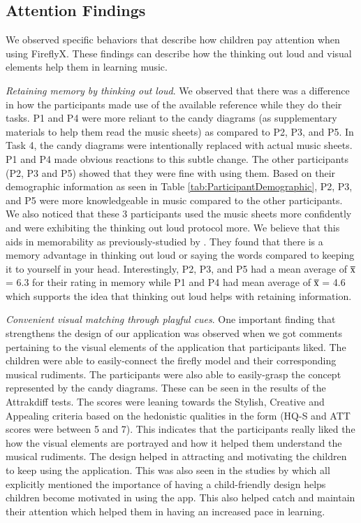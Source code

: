 \subsection{Attention Findings}
We observed specific behaviors that describe how children pay attention when using FireflyX. These findings can describe how the thinking out loud and visual elements help them in learning music.


\textit{Retaining memory by thinking out loud}. We observed that there was a difference in how the participants made use of the available reference while they do their tasks. P1 and P4 were more reliant to the candy diagrams (as supplementary materials to help them read the music sheets) as compared to P2, P3, and P5. In Task 4, the candy diagrams were intentionally replaced with actual music sheets. P1 and P4 made obvious reactions to this subtle change. The other participants (P2, P3 and P5) showed that they were fine with using them. Based on their demographic information as seen in Table \ref{tab:ParticipantDemographic}, P2, P3, and P5 were more knowledgeable in music compared to the other participants. We also noticed that these 3 participants used the music sheets more confidently and were exhibiting the thinking out loud protocol more. We believe that this aids in memorability as previously-studied by . They found that there is a memory advantage in thinking out loud or saying the words compared to keeping it to yourself in your head. Interestingly, P2, P3, and P5 had a mean average of x̅ = 6.3 for their rating in memory while P1 and P4 had mean average of x̅ = 4.6 which supports the idea that thinking out loud helps with retaining information.

\textit{Convenient visual matching through playful cues}. One important finding that strengthens the design of our application was observed when we got comments pertaining to the visual elements of the application that participants liked. The children were able to easily-connect the firefly model and their corresponding musical rudiments. The participants were also able to easily-grasp the concept represented by the candy diagrams. These can be seen in the results of the Attrakdiff tests.  The scores were leaning towards the Stylish, Creative and Appealing criteria based on the hedonistic qualities in the form (HQ-S and ATT scores were between 5 and 7). This indicates that the participants really liked the how the visual elements are portrayed and how it helped them understand the musical rudiments. The design helped in attracting and motivating the children to keep using the application. This was also seen in the studies by \cite{cohen2011young,burton2016music,chung2017designing} which all explicitly mentioned the importance of having a child-friendly design helps children become motivated in using the app. This also helped catch and maintain their attention which helped them in having an increased pace in learning. 

